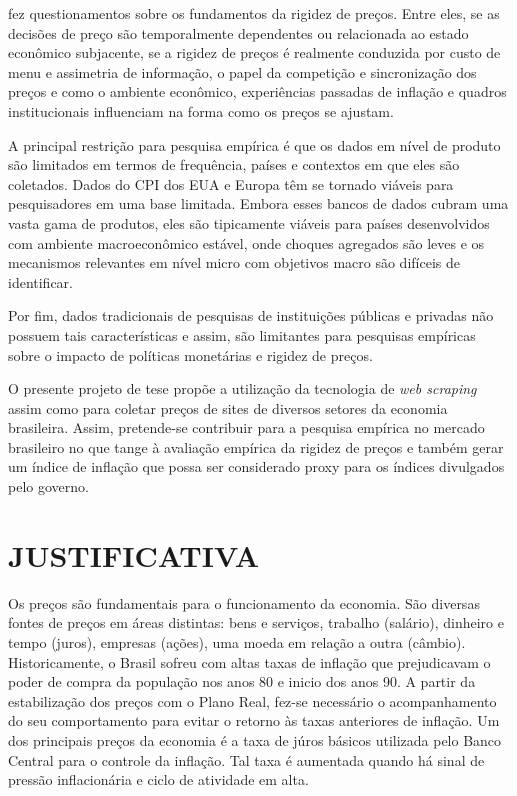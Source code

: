 \documentclass[twoside,a4paper,11pt]{report}
\begin{document}
\citet{cavallo2010scraped} fez questionamentos sobre os fundamentos da rigidez de preços. Entre eles, se as decisões de preço são temporalmente dependentes ou relacionada ao estado econômico subjacente, se a rigidez de preços é realmente conduzida por custo de menu e assimetria de informação, o papel da competição e sincronização dos preços e como o ambiente econômico, experiências passadas de inflação e quadros institucionais influenciam na forma como os preços se ajustam.

A principal restrição para pesquisa empírica é que os dados em nível de produto são limitados em termos de frequência, países e contextos em que eles são coletados. Dados do CPI dos EUA e Europa têm se tornado viáveis para pesquisadores em uma base limitada. Embora esses bancos de dados cubram uma vasta gama de produtos, eles são tipicamente viáveis para países desenvolvidos com ambiente macroeconômico estável, onde choques agregados são leves e os mecanismos relevantes em nível micro com objetivos macro são difíceis de identificar. 

Por fim, dados tradicionais de pesquisas de instituições públicas e privadas não possuem tais características e assim, são limitantes para pesquisas empíricas sobre o impacto de políticas monetárias e rigidez de preços.

O presente projeto de tese propõe a utilização da tecnologia de \emph{web scraping} assim como \citet{cavallo2010scraped} para coletar preços de sites de diversos setores da economia brasileira. Assim, pretende-se contribuir para a pesquisa empírica no mercado brasileiro no que tange à avaliação empírica da rigidez de preços e também gerar um índice de inflação que possa ser considerado proxy para os índices divulgados pelo governo. 

\section*{JUSTIFICATIVA}

Os preços são fundamentais para o funcionamento da economia. São diversas fontes de preços em áreas distintas: bens e serviços, trabalho (salário), dinheiro e tempo (juros), empresas (ações), uma moeda em relação a outra (câmbio). Historicamente, o Brasil sofreu com altas taxas de inflação que prejudicavam o poder de compra da população nos anos 80 e inicio dos anos 90. A partir da estabilização dos preços com o Plano Real, fez-se necessário o acompanhamento do seu comportamento para evitar o retorno às taxas anteriores de inflação. Um dos principais preços da economia é a taxa de júros básicos utilizada pelo Banco Central para o controle da inflação. Tal taxa é aumentada quando há sinal de pressão inflacionária e ciclo de atividade em alta.
\end{document}
